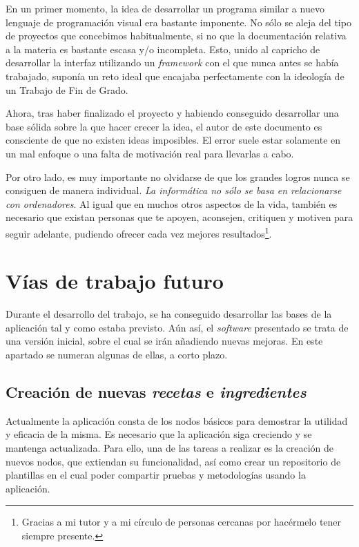 En un primer momento, la idea de desarrollar un programa similar a nuevo lenguaje de programación visual era bastante imponente. No sólo se aleja del tipo de proyectos que concebimos habitualmente, si no que la documentación relativa a la materia es bastante escasa y/o incompleta. Esto, unido al capricho de desarrollar la interfaz utilizando un \textit{framework} con el que nunca antes se había trabajado, suponía un reto ideal que encajaba perfectamente con la ideología de un Trabajo de Fin de Grado.\sn

Ahora, tras haber finalizado el proyecto y habiendo conseguido desarrollar una base sólida sobre la que hacer crecer la idea, el autor de este documento es consciente de que no existen ideas imposibles. El error suele estar solamente en un mal enfoque o una falta de motivación real para llevarlas a cabo.\sn

Por otro lado, es muy importante no olvidarse de que los grandes logros nunca se consiguen de manera individual. \emph{La informática no sólo se basa en relacionarse con ordenadores}. Al igual que en muchos otros aspectos de la vida, también es necesario que existan personas que te apoyen, aconsejen, critiquen y motiven para seguir adelante, pudiendo ofrecer cada vez mejores resultados\footnote{Gracias a mi tutor y a mi círculo de personas cercanas por hacérmelo tener siempre presente.}.

\newpage


\section{Vías de trabajo futuro} \label{sec:future}

Durante el desarrollo del trabajo, se ha conseguido desarrollar las bases de la aplicación tal y como estaba previsto. Aún así, el \textit{software} presentado se trata de una versión inicial, sobre el cual se irán añadiendo nuevas mejoras. En este apartado se numeran algunas de ellas, a corto plazo.\sn

\subsection{Creación de nuevas \textit{recetas} e \textit{ingredientes}} \label{sub:newrecipesandingredients}

Actualmente la aplicación consta de los nodos básicos para demostrar la utilidad y eficacia de la misma. Es necesario que la aplicación siga creciendo y se mantenga actualizada. Para ello, una de las tareas a realizar es la creación de nuevos nodos, que extiendan su funcionalidad, así como crear un repositorio de plantillas en el cual poder compartir pruebas y metodologías usando la aplicación.\sn

